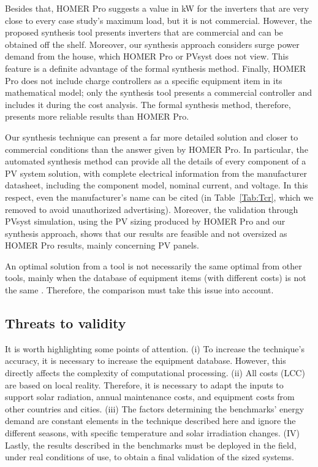 \documentclass[journal]{IEEEtran}
\begin{document}
Besides that, HOMER Pro suggests a value in kW for the inverters that are very close to every case study's maximum load, but it is not commercial. However, the proposed synthesis tool presents inverters that are commercial and can be obtained off the shelf. Moreover, our synthesis approach considers surge power demand from the house, which HOMER Pro or PVsyst does not view. This feature is a definite advantage of the formal synthesis method. Finally, HOMER Pro does not include charge controllers as a specific equipment item in its mathematical model; only the synthesis tool presents a commercial controller and includes it during the cost analysis. The formal synthesis method, therefore, presents more reliable results than HOMER Pro.

Our synthesis technique can present a far more detailed solution and closer to commercial conditions than the answer given by HOMER Pro. In particular, the automated synthesis method can provide all the details of every component of a PV system solution, with complete electrical information from the manufacturer datasheet, including the component model, nominal current, and voltage. In this respect, even the manufacturer's name can be cited (in Table~\ref{Tab:Tcr}, which we removed to avoid unauthorized advertising). Moreover, the validation through PVsyst simulation, using the PV sizing produced by HOMER Pro and our synthesis approach, shows that our results are feasible and not oversized as HOMER Pro results, mainly concerning PV panels.

An optimal solution from a tool is not necessarily the same optimal from other tools, mainly when the database of equipment items (with different costs) is not the same \cite{Alsadi2018}. Therefore, the comparison must take this issue into account. 

\subsection{Threats to validity} 

It is worth highlighting some points of attention. (i) To increase the technique's accuracy, it is necessary to increase the equipment database. However, this directly affects the complexity of computational processing. (ii) All costs (LCC) are based on local reality. Therefore, it is necessary to adapt the inputs to support solar radiation, annual maintenance costs, and equipment costs from other countries and cities. (iii) The factors determining the benchmarks' energy demand are constant elements in the technique described here and ignore the different seasons, with specific temperature and solar irradiation changes. (IV) Lastly, the results described in the benchmarks must be deployed in the field, under real conditions of use, to obtain a final validation of the sized systems.
\end{document}
